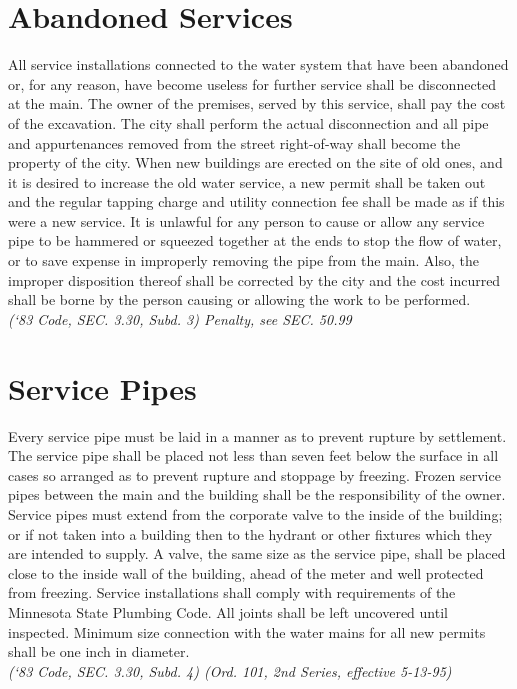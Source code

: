 \section{Abandoned Services}
All service installations connected to the water system that have been abandoned or, for any reason, have become useless for further service shall be disconnected at the main.  The owner of the premises, served by this service, shall pay the cost of the excavation.  The city shall perform the actual disconnection and all pipe and appurtenances removed from the street right-of-way shall become the property of the city.  When new buildings are erected on the site of old ones, and it is desired to increase the old water service, a new permit shall be taken out and the regular tapping charge and utility connection fee shall be made as if this were a new service.  It is unlawful for any person to cause or allow any service pipe to be hammered or squeezed together at the ends to stop the flow of water, or to save expense in improperly removing the pipe from the main.  Also, the improper disposition thereof shall be corrected by the city and the cost incurred shall be borne by the person causing or allowing the work to be performed.\\
\emph{(‘83 Code, SEC. 3.30, Subd. 3)  Penalty, see SEC. 50.99}
\section{Service Pipes}
Every service pipe must be laid in a manner as to prevent rupture by settlement.  The service pipe shall be placed not less than seven feet below the surface in all cases so arranged as to prevent rupture and stoppage by freezing.  Frozen service pipes between the main and the building shall be the responsibility of the owner.  Service pipes must extend from the corporate valve to the inside of the building; or if not taken into a building then to the hydrant or other fixtures which they are intended to supply.  A valve, the same size as the service pipe, shall be placed close to the inside wall of the building, ahead of the meter and well protected from freezing.  Service installations shall comply with requirements of the Minnesota State Plumbing Code.  All joints shall be left uncovered until inspected.  Minimum size connection with the water mains for all new permits shall be one inch in diameter.\\
\emph{(‘83 Code, SEC. 3.30, Subd. 4) (Ord. 101, 2nd Series, effective 5-13-95)}
